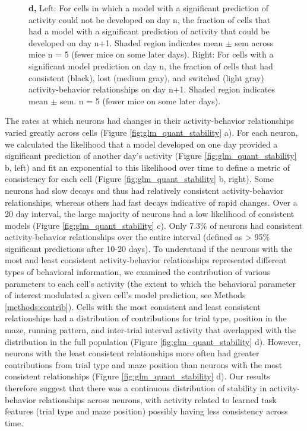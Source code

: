 \begin{figure}
{%
\textbf{d,} Left: For cells in which a model with a significant prediction of activity could not be developed on day n, the fraction of cells that had a model with a significant prediction of activity that could be developed on day n+1. Shaded region indicates mean $\pm$ sem across mice n = 5 (fewer mice on some later days).  Right: For cells with a significant model prediction on day n, the fraction of cells that had consistent (black), lost (medium gray), and switched (light gray) activity-behavior relationships on day n+1. Shaded region indicates mean $\pm$ sem. n = 5 (fewer mice on some later days). 
\label{fig:4_glm_across_population}}
\end{figure}

\bigskip

The rates at which neurons had changes in their activity-behavior relationships varied greatly across cells (Figure \ref{fig:glm_quant_stability} a). For each neuron, we calculated the likelihood that a model developed on one day provided a significant prediction of another day's activity (Figure \ref{fig:glm_quant_stability} b, left) and fit an exponential to this likelihood over time to define a metric of consistency for each cell (Figure \ref{fig:glm_quant_stability} b, right). Some neurons had slow decays and thus had relatively consistent activity-behavior relationships, whereas others had fast decays indicative of rapid changes. Over a 20 day interval, the large majority of neurons had a low likelihood of consistent models (Figure \ref{fig:glm_quant_stability} c). Only 7.3$\%$ of neurons had consistent activity-behavior relationships over the entire interval (defined as > 95$\%$ significant predictions after 10-20 days). To understand if the neurons with the most and least consistent activity-behavior relationships represented different types of behavioral information, we examined the contribution of various parameters to each cell's activity (the extent to which the behavioral parameter of interest modulated a given cell's model prediction, see Methods \ref{methods:contrib}). Cells with the most consistent and least consistent relationships had a distribution of contributions for trial type, position in the maze, running pattern, and inter-trial interval activity that overlapped with the distribution in the full population (Figure \ref{fig:glm_quant_stability} d). However, neurons with the least consistent relationships more often had greater contributions from trial type and maze position than neurons with the most consistent relationships (Figure \ref{fig:glm_quant_stability} d). Our results therefore suggest that there was a continuous distribution of stability in activity-behavior relationships across neurons, with activity related to learned task features (trial type and maze position) possibly having less consistency across time. 

